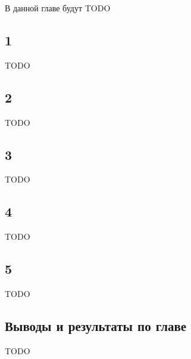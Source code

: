\documentclass[../diploma.tex]{subfiles}
\begin{document}
\label{sec:2}

В данной главе будут TODO

\subsection{1}

TODO

\subsection{2}

TODO

\subsection{3}

TODO

\subsection{4}

TODO

\subsection{5}

TODO

\subsection{Выводы и результаты по главе}

TODO
\end{document}
